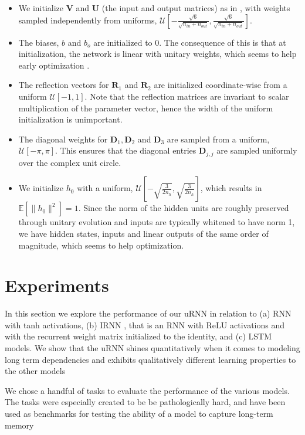 \documentclass{article} %
\newcommand{\matr}[1]{\mathbf{#1}}
\begin{document}
\begin{itemize}
  \item We initialize $\matr{V}$ and $\matr{U}$ (the input and output matrices) as in \cite{Glorotinit},
  with weights sampled independently from uniforms, $\mathcal{U}\left[-\frac{\sqrt{6}}{\sqrt{n_{in}+ n_{out}}}, \frac{\sqrt{6}}{\sqrt{n_{in}+ n_{out}}}\right]$.
  \item The biases, $b$ and $b_o$ are initialized to 0. The consequence of this is that at initialization, 
    the network is linear with unitary weights, which seems to help early optimization \citep{Saxe2014}.
  \item The reflection vectors for $\matr{R}_1$ and $\matr{R}_2$ are initialized coordinate-wise from a 
  uniform $\mathcal{U}[-1, 1]$. Note that the reflection matrices are invariant to scalar multiplication 
  of the parameter vector, hence the width of the uniform initialization is unimportant.
  \item The diagonal weights for $\matr{D}_1, \matr{D}_2$ and $\matr{D}_3$ are sampled 
  from a uniform, $\mathcal{U}[-\pi, \pi]$. This ensures that the diagonal entries $\matr{D}_{j,j}$
  are sampled uniformly over the complex unit circle.
  \item We initialize $h_0$ with a uniform, 
  $\mathcal{U}\left[-\sqrt{\frac{3}{2n_h}}, \sqrt{\frac{3}{2n_h}} \right]$, 
  which results in $\mathbb{E}\left[\|h_0\|^2\right] = 1$. Since the norm of the hidden units are roughly 
  preserved through unitary evolution and inputs are typically whitened to have norm 1, 
  we have hidden states, inputs and linear outputs of the same order of magnitude, which seems to
  help optimization.
\end{itemize}

\section{Experiments}
\label{expts}

In this section we explore the performance of our uRNN in relation to (a) RNN with tanh activations,
(b) IRNN \citep{Quoc2015}, that is 
an RNN with ReLU activations and with the recurrent weight matrix initialized to the identity, 
and (c) LSTM \citep{LSTM} models. We show that the uRNN shines quantitatively when it comes to modeling 
long term dependencies and exhibits qualitatively different learning properties to the other models 
 
We chose a handful of tasks to evaluate the performance of the various models.
The tasks were especially created to be be pathologically hard, and have been used 
as benchmarks for testing the ability of a model to capture long-term memory \citep{LSTM, Quoc2015, NTM, HF}
\end{document}
